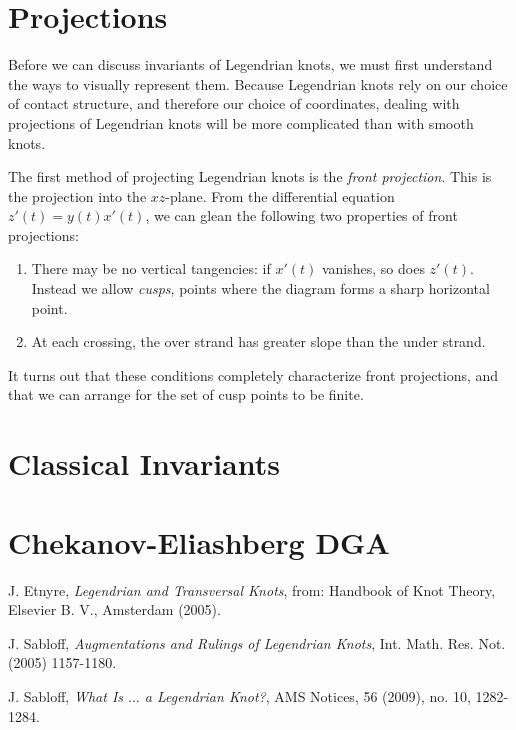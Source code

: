 \documentclass{article}
\begin{document}
\section{Projections}
Before we can discuss invariants of Legendrian knots, we must first understand
the ways to visually represent them.
Because Legendrian knots rely on our choice of contact structure, and therefore
our choice of coordinates, dealing with projections of Legendrian knots will
be more complicated than with smooth knots.

The first method of projecting Legendrian knots is the {\it front projection}.
This is the projection into the $xz$-plane. From the differential equation
$z'(t) = y(t)x'(t)$, we can glean the following two properties of front projections:
\begin{enumerate}[label=\roman*)]
\item There may be no vertical tangencies: if $x'(t)$ vanishes, so does $z'(t)$. Instead we 
allow {\it cusps}, points where the diagram forms a sharp horizontal point.
\item At each crossing, the over strand has greater slope than the under strand.
\end{enumerate}
It turns out that these conditions completely characterize front projections, and
that we can arrange for the set of cusp points to be finite.

\section{Classical Invariants}

\section{Chekanov-Eliashberg DGA}

\begin{thebibliography}{9}
    J. Etnyre,
    \textit{Legendrian and Transversal Knots},
    from: Handbook of Knot Theory,
    Elsevier B. V.,
    Amsterdam (2005).

    J. Sabloff,
    \textit{Augmentations and Rulings of Legendrian Knots},
    Int. Math. Res. Not. (2005) 1157-1180.

    J. Sabloff,
    \textit{What Is $\ldots$ a Legendrian Knot?},
    AMS Notices, 56 (2009), no. 10, 1282-1284.
\end{thebibliography}
\end{document}
